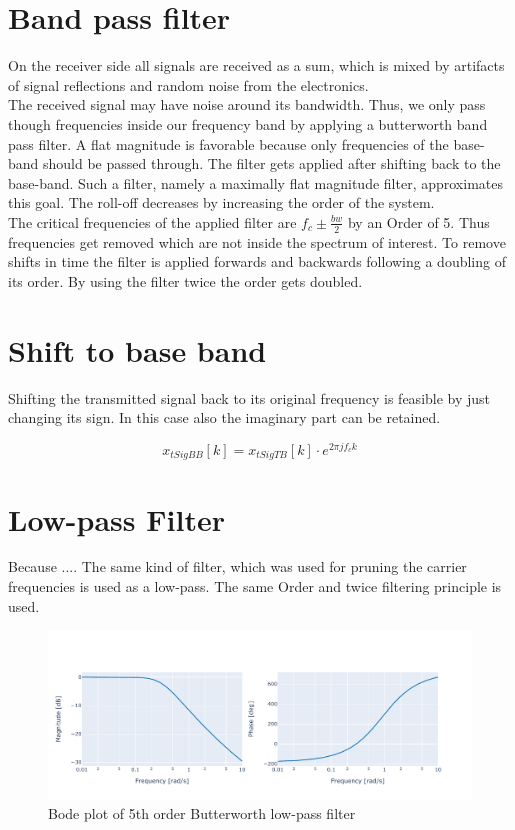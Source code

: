 \section{Band pass filter}
On the receiver side all signals are received as a sum, which is mixed by artifacts of signal reflections and random noise from the electronics.\\
The received signal may have noise around its bandwidth. Thus, we only pass though frequencies inside our frequency band by applying a butterworth band pass filter.
A flat magnitude is favorable because only frequencies of the base-band should be passed through. 
The filter gets applied after shifting back to the base-band. Such a filter, namely a maximally flat magnitude filter, approximates this goal. The roll-off decreases by increasing the order of the system.\\
The critical frequencies of the applied filter are $f_c\pm\frac{bw}{2}$ by an Order of 5. Thus frequencies get removed which are not inside the spectrum of interest. To remove shifts in time the filter is applied forwards and backwards following a doubling of its order. By using the filter twice the order gets doubled.

\section{Shift to base band}

Shifting the transmitted signal back to its original frequency is feasible by just changing its sign. In this case also the imaginary part can be retained.

\begin{equation}
	x_{tSigBB}[k]=x_{tSigTB}[k]\cdot e^{2\pi j f_c k}
	\label{eq:rshift}
\end{equation}

\section{Low-pass Filter}
Because .... The same kind of filter, which was used for pruning the carrier frequencies is used as a low-pass. The same Order and twice filtering principle is used.
\begin{figure}[h]
	\includegraphics[width=\linewidth]{images/bode}
	
	\caption{Bode plot of 5th order Butterworth low-pass filter}
	\label{fig:bode}
\end{figure}

